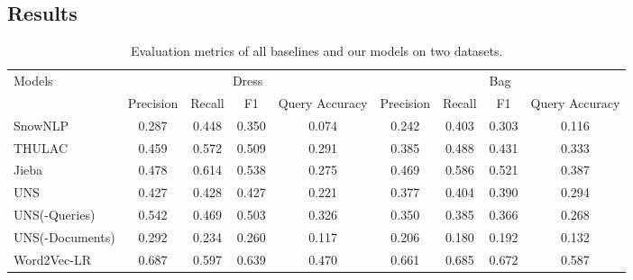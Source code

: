 \subsection{Results}
\label{sec:results}

\begin{table}[h!]
	\centering
	\small
	\caption{Evaluation metrics of all baselines and our models on two datasets.}
	\begin{tabular}{lcccccccc}%
		\toprule
		\multirow{2}{*}{Models} & \multicolumn{4}{c}{Dress} & \multicolumn{4}{c}{Bag}                                                                                                       \\
		\cmidrule(lr){2-5} \cmidrule(lr){6-9}
		                        & Precision                 & Recall                  & F1             & Query Accuracy & Precision      & Recall         & F1             & Query Accuracy \\
		\midrule
		SnowNLP                 & 0.287                     & 0.448                   & 0.350          & 0.074          & 0.242          & 0.403          & 0.303          & 0.116          \\
		THULAC                  & 0.459                     & 0.572                   & 0.509          & 0.291          & 0.385          & 0.488          & 0.431          & 0.333          \\
		Jieba                   & 0.478                     & 0.614                   & 0.538          & 0.275          & 0.469          & 0.586          & 0.521          & 0.387          \\
		\midrule
		UNS                     & 0.427                     & 0.428                   & 0.427          & 0.221          & 0.377          & 0.404          & 0.390          & 0.294          \\
		UNS(-Queries)           & 0.542                     & 0.469                   & 0.503          & 0.326          & 0.350          & 0.385          & 0.366          & 0.268          \\
		UNS(-Documents)         & 0.292                     & 0.234                   & 0.260          & 0.117          & 0.206          & 0.180          & 0.192          & 0.132          \\
		\midrule
		Word2Vec-LR             & 0.687                     & 0.597                   & 0.639          & 0.470          & 0.661          & 0.685          & 0.672          & 0.587          \\

\end{tabular}
\end{table}
